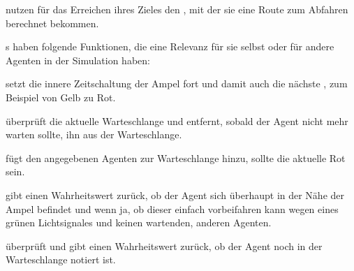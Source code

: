  nutzen für das Erreichen ihres Zieles den , mit der sie eine Route zum Abfahren berechnet bekommen.


s haben folgende Funktionen, die eine Relevanz für sie selbst oder für andere Agenten in der Simulation haben:

 setzt die innere Zeitschaltung der Ampel fort und damit auch die nächste , zum Beispiel von Gelb zu Rot.

 überprüft die aktuelle Warteschlange und entfernt, sobald der Agent nicht mehr warten sollte, ihn aus der Warteschlange.

 fügt den angegebenen Agenten zur Warteschlange hinzu, sollte die aktuelle  Rot sein.

 gibt einen Wahrheitswert zurück, ob der Agent sich überhaupt in der Nähe der Ampel befindet und wenn ja, ob dieser einfach vorbeifahren kann wegen eines grünen Lichtsignales und keinen wartenden, anderen Agenten.

 überprüft und gibt einen Wahrheitswert zurück, ob der Agent noch in der Warteschlange notiert ist.
